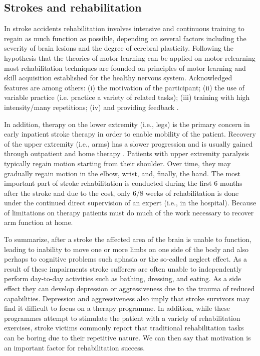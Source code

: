 \documentclass[preprint,authoryear,12pt]{elsarticle}
\begin{document}
\subsection{Strokes and rehabilitation}
\label{theraphy}
In stroke accidents rehabilitation involves intensive and continuous training to regain as much function as possible, depending on several factors including the severity of brain lesions and the degree of cerebral plasticity. 
Following the hypothesis that the theories of motor learning can be applied on motor relearning most rehabilitation techniques are founded on principles of motor learning and skill acquisition established for the healthy nervous system.
Acknowledged features are among others: (i) the motivation of the participant; (ii) the use of variable practice (i.e. practice a variety of related tasks); (iii) training with high intensity/many repetitions; (iv) and providing feedback  \citep{Krakauer06, Levin, Langhorne}. 

In addition, therapy on the lower extremity (i.e., legs) is the primary concern in early inpatient stroke therapy in order to enable mobility of the patient. Recovery of the upper extremity (i.e., arms) has a slower progression and is usually gained through outpatient and home therapy \citep{Lee99}. Patients with upper extremity paralysis typically regain motion starting from their shoulder. Over time, they may gradually regain motion in the elbow, wrist, and, finally, the hand. The most important part of stroke rehabilitation is conducted during the first 6 months after the stroke and due to the cost, only 6/8 weeks of rehabilitation is done under the continued direct supervision of an expert (i.e., in the hospital). Because of limitations on therapy patients must do much of the work necessary to recover arm function at home.

To summarize, after a stroke the affected area of the brain is unable to function, leading to inability to move one or more limbs on one side of the body and also perhaps to cognitive problems such aphasia or the so-called neglect effect. As a result of these impairments stroke sufferers are often unable to independently perform day-to-day activities such as bathing, dressing, and eating. As a side effect they can develop depression or aggressiveness due to the trauma of reduced capabilities. Depression and aggressiveness also imply that stroke survivors may find it difficult to focus on a therapy programme.  In addition, while these programmes attempt to stimulate the patient with a variety of rehabilitation exercises, stroke victims commonly report that traditional rehabilitation tasks can be boring due to their repetitive nature. We can then say that motivation is an important factor for rehabilitation success.  
\end{document}

